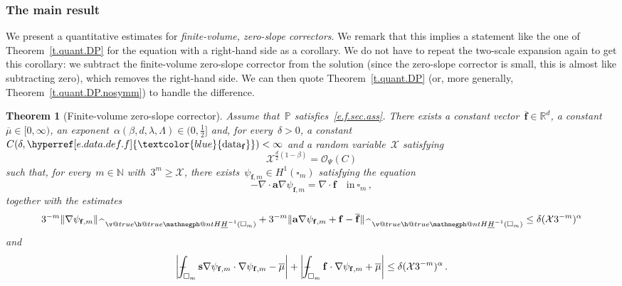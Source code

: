 \documentclass[11pt,twoside]{article} %
\makeatletter
\let\oldsquare\square %
\renewcommand{\square}{\oldsquare}
\numberwithin{equation}{section}
\newtheorem{theorem}{Theorem}[section]
\theoremstyle{definition}
\newcommand{\datareff}{\hyperref[e.data.def.f]{\textcolor{blue}{\ensuremath{\mathrm{data}_{\mathbf{f}}}}}}
\newcommand*{\N}{\ensuremath{\mathbb{N}}}
\newcommand*{\R}{\ensuremath{\mathbb{R}}}
\renewcommand*{\hat}{\widehat}
\newcommand{\f}{\mathbf{f}}
\newcommand{\s}{\mathbf{s}}
\renewcommand{\a}{\mathbf{a}}
\newcommand{\cu}{\square}
\renewcommand{\P}{\mathbb{P}}
\newcommand{\X}{\mathcal{X}}
\renewcommand{\O}{\mathcal{O}}
\def\Xint#1{\mathchoice
{\XXint\displaystyle\textstyle{#1}}%
{\XXint\textstyle\scriptstyle{#1}}%
{\XXint\scriptstyle\scriptscriptstyle{#1}}%
{\XXint\scriptscriptstyle\scriptscriptstyle{#1}}%
\!\int}
\def\XXint#1#2#3{{\setbox0=\hbox{$#1{#2#3}{\int}$}
\vcenter{\hbox{$#2#3$}}\kern-.5\wd0}}
\def\fint{\Xint-}
\newcommand{\negphantom}{\v@true\h@true\negph@nt}
\newcommand{\negph@nt}{\ifmmode\expandafter\mathpalette 
  \expandafter\mathnegph@nt\else\expandafter\makenegph@nt\fi}
\newcommand{\makenegph@nt}[1]{%
  \setbox\z@\hbox{\color@begingroup#1\color@endgroup}\finnegph@nt}
\newcommand{\finnegph@nt}{%
  \setbox\tw@\null 
  \ifv@ \ht\tw@\ht\z@\dp\tw@\dp\z@\fi \ifh@\wd\tw@-\wd\z@\fi\box\tw@}
\newcommand{\mathnegph@nt}[2]{%
  \setbox\z@\hbox{$\m@th #1{#2}$}\finnegph@nt}
\newcommand{\Hminusul}{\hat{\phantom{H}}\negphantom{H}\underline{H}^{-1}}
\makeatother
\begin{document}
\subsubsection{The main result}


We present a quantitative estimates for \emph{finite-volume, zero-slope correctors}. 
We remark that this implies a statement like the one of Theorem~\ref{t.quant.DP} for the equation with a right-hand side as a corollary. We do not have to repeat the two-scale expansion again to get this corollary: we subtract the finite-volume zero-slope corrector from the solution (since the zero-slope corrector is small, this is almost like subtracting zero), which removes the right-hand side. We can then quote Theorem~\ref{t.quant.DP} (or, more generally, Theorem~\ref{t.quant.DP.nosymm}) to handle the difference.

\begin{theorem}[Finite-volume zero-slope corrector]
\label{t.zeroslope}
\hspace{-4pt}
Assume that~$\P$ satisfies~\eqref{e.f.sec.ass}. 
\hspace{-6pt}
There exists a constant vector~$\overline{\f}\in\R^d$, a constant~$\overline{\mu} \in [0,\infty)$, an exponent~$\alpha(\beta,d,\lambda,\Lambda) \in (0,\tfrac12]$ and, for every~$\delta>0$, a constant~$C(\delta,\datareff)<\infty$ and a random variable~$\X$ satisfying 
\begin{equation}
\label{e.mmmbound}
\X^{\frac d2 (1-\beta)}
= \O_\Psi(C)
\end{equation}
such that, for every~$m\in\N$ with~$3^m \geq \X$, there exists~$\psi_{\f,m} \in H^1(\cu_m)$ satisfying the equation
\begin{equation}
-\nabla \cdot \a\nabla \psi_{\f,m} = \nabla \cdot \f \quad \mbox{in} \ \cu_m\,,
\end{equation}
together with the estimates
\begin{equation}
\label{e.zeroslope.sublin}
3^{-m}\| \nabla \psi_{\f,m} \|_{\Hminusul(\cu_m)} 
+
3^{-m}\| \a \nabla \psi_{\f,m} +\f - \overline{\f} \|_{\Hminusul(\cu_m)} 
\leq
\delta ( \X 3^{-m} )^{\alpha}
\end{equation}
and
\begin{equation} 
\label{e.zeroslope.energy}
\biggl| \fint_{\cu_m} \s \nabla\psi_{\f,m} \cdot \nabla \psi_{\f,m}  - \overline{\mu} \biggr| 
+
\biggl| \fint_{\cu_m} \f \cdot \nabla \psi_{\f,m}  + \overline{\mu} \biggr| 
\leq
\delta ( \X 3^{-m} )^{\alpha} 
 \,.
\end{equation}
\end{theorem}
\end{document}
